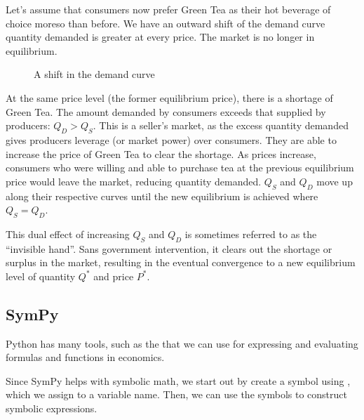 \documentclass[letterpaper,10pt,english]{jupyterBook}
\let\sphinxpxdimen\pdfpxdimen\else\newdimen\sphinxpxdimen
\begin{document}
\sphinxAtStartPar
Let’s assume that consumers now prefer Green Tea as their hot beverage of choice moreso than before. We have an outward shift of the demand curve \sphinxhyphen{} quantity demanded is greater at every price. The market is no longer in equilibrium.

\begin{figure}[htbp]
\centering
\capstart

\noindent\sphinxincludegraphics[width=500\sphinxpxdimen]{{fig1-demand}.png}
\caption{A shift in the demand curve}\label{\detokenize{content/02-supply/03-market-equilibria:demand-shift}}\end{figure}

\sphinxAtStartPar
At the same price level (the former equilibrium price), there is a shortage of Green Tea. The amount demanded by consumers exceeds that supplied by producers: \(Q_D > Q_S\). This is a seller’s market, as the excess quantity demanded gives producers leverage (or market power) over consumers. They are able to increase the price of Green Tea to clear the shortage. As prices increase, consumers who were willing and able to purchase tea at the previous equilibrium price would leave the market, reducing quantity demanded. \(Q_S\) and \(Q_D\) move up along their respective curves until the new equilibrium is achieved where \(Q_S = Q_D\).

\sphinxAtStartPar
This dual effect of increasing \(Q_S\) and \(Q_D\) is sometimes referred to as the “invisible hand”. Sans government intervention, it clears out the shortage or surplus in the market, resulting in the eventual convergence to a new equilibrium level of quantity \(Q^*\) and price \(P^*\).


\subsection{SymPy}
\label{\detokenize{content/02-supply/04-sympy:sympy}}\label{\detokenize{content/02-supply/04-sympy::doc}}
\sphinxAtStartPar
Python has many tools, such as the  that we can use for expressing and evaluating formulas and functions in economics.

\sphinxAtStartPar
Since SymPy helps with symbolic math, we start out by create a symbol using , which we assign to a variable name. Then, we can use the symbols to construct symbolic expressions.

\begin{sphinxVerbatim}[commandchars=\\\{\}]
  
\end{sphinxVerbatim}
\end{document}
